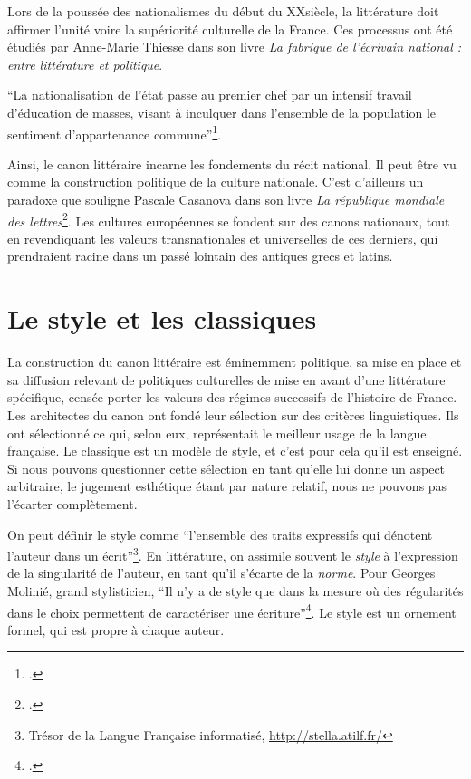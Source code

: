
Lors de la poussée des nationalismes du début du XX\ieme siècle, la littérature doit affirmer l'unité voire la supériorité culturelle de la France. Ces processus ont été étudiés par Anne-Marie Thiesse dans son livre \textit{La fabrique de l'écrivain national : entre littérature et politique}. 
\begin{displayquote}\enquote{La nationalisation de l'état passe au premier chef par un intensif travail d'éducation de masses, visant à inculquer dans l'ensemble de la population le sentiment d'appartenance commune}\footcites{thiesse_fabrique_2019}. \end{displayquote}

Ainsi, le canon littéraire incarne les fondements du récit national. Il peut être vu comme la construction politique de la culture nationale. C'est d'ailleurs un paradoxe que souligne Pascale Casanova dans son livre \textit{La république mondiale des lettres}\footcites{casanova_republique_2008}. Les cultures européennes se fondent sur des canons nationaux, tout en revendiquant les valeurs transnationales et universelles de ces derniers, qui prendraient racine dans un passé lointain des antiques grecs et latins.


\section{Le style et les classiques}
La construction du canon littéraire est éminemment politique, sa mise en place et sa diffusion relevant de politiques culturelles de mise en avant d'une littérature spécifique, censée porter les valeurs des régimes successifs de l'histoire de France. Les architectes du canon ont fondé leur sélection sur des critères linguistiques. Ils ont sélectionné ce qui, selon eux, représentait le meilleur usage de la langue française. Le classique est un modèle de style, et c'est pour cela qu'il est enseigné. Si nous pouvons questionner cette sélection en tant qu'elle lui donne un aspect arbitraire, le jugement esthétique étant par nature relatif, nous ne pouvons pas l'écarter complètement.

On peut définir le style comme \enquote{l'ensemble des traits expressifs qui dénotent l'auteur dans un écrit}\footnote{ Trésor de la Langue Française informatisé, \url{http://stella.atilf.fr/}}. En littérature, on assimile souvent le \textit{style} à l'expression de la singularité de l'auteur, en tant qu'il s'écarte de la \textit{norme}. Pour Georges Molinié, grand stylisticien, \enquote{Il n'y a de style que dans la mesure où des régularités dans le choix permettent de caractériser une écriture}\footcites{molinie_quest-ce_1994}. Le style est un ornement formel, qui est propre à chaque auteur. 




